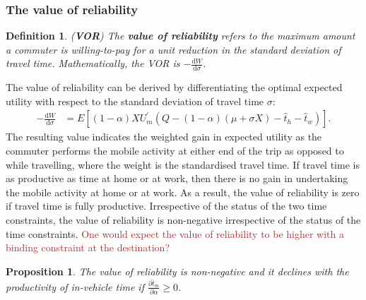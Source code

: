 \documentclass[12pt,a4paper,british]{article}
\newtheorem{definition}{Definition}[section]
\newtheorem{prop}{Proposition}[section]
\begin{document}
\subsubsection*{The value of reliability }
\begin{definition}
(\textbf{VOR}) The \textbf{\textit{value of reliability}} refers to the maximum amount a commuter is willing-to-pay for a unit reduction in the standard deviation of travel time. Mathematically, the VOR is $-\frac{\mathrm{d}W}{\mathrm{d}\sigma}$.
\end{definition}
The value of reliability can be derived by differentiating the optimal expected utility with respect to the standard deviation of travel
time $\sigma$: 
\begin{align*}
-\frac{\mathrm{d}W}{\mathrm{d}\sigma} & =E\left[\left(1-\alpha\right)XU_{m}^{\prime}\left(Q-\left(1-\alpha\right)\left(\mu+\sigma X\right)-\hat{t}_{h}-\hat{t}_{w}\right)\right].
\end{align*}
The resulting value indicates the weighted gain in expected utility as the commuter performs the mobile activity at either end of the
trip as opposed to while travelling, where the weight is the standardised travel time. If travel time is as productive as time at home or at work, then there is no gain in undertaking the mobile activity at home or at work. As a result, the value of reliability is zero if travel time is fully productive. Irrespective of the status of the two time constraints, the value of reliability is non-negative irrespective of the status of the time constraints. \textcolor{brown}{One would expect the value of reliability to be higher with a binding constraint at the destination?} 
\begin{prop}
The value of reliability is non-negative and it declines with the productivity of in-vehicle time if $\frac{\partial\hat{t}_{m}}{\partial\alpha}\geq0$. 
\end{prop}
\end{document}

